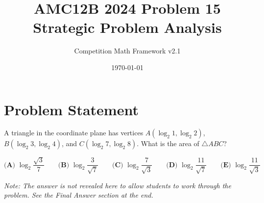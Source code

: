 \documentclass[12pt]{article}
\begin{document}
\title{AMC12B 2024 Problem 15\\Strategic Problem Analysis}
\author{Competition Math Framework v2.1}
\date{\today}
\maketitle

\section*{Problem Statement}

A triangle in the coordinate plane has vertices $A(\log_2 1, \log_2 2)$, $B(\log_2 3, \log_2 4)$, and $C(\log_2 7, \log_2 8)$. What is the area of $\triangle ABC$?

$$\textbf{(A) }\log_2\frac{\sqrt{3}}{7}\qquad \textbf{(B) }\log_2\frac{3}{\sqrt{7}}\qquad \textbf{(C) }\log_2\frac{7}{\sqrt{3}}\qquad \textbf{(D) }\log_2\frac{11}{\sqrt{7}}\qquad \textbf{(E) }\log_2\frac{11}{\sqrt{3}}$$

\vspace{0.3cm}
\noindent\textit{Note: The answer is not revealed here to allow students to work through the problem. See the Final Answer section at the end.}
\end{document}
